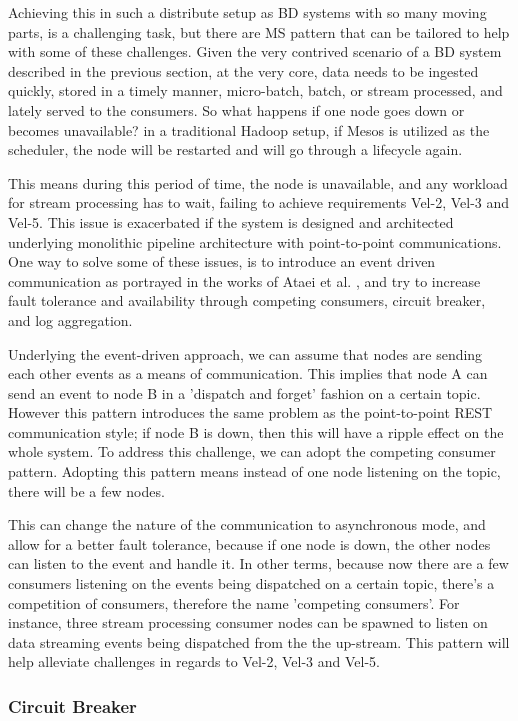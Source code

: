 \documentclass[a4paper,11pt,article,oneside]{memoir}
\begin{document}
Achieving this in such a distribute setup as BD systems with so many moving parts, is a challenging task, but there are MS pattern that can be tailored to help with some of these challenges. Given the very contrived scenario of a BD system described in the previous section, at the very core, data needs to be ingested quickly, stored in a timely manner, micro-batch, batch, or stream processed, and lately served to the consumers. So what happens if one node goes down or becomes unavailable? in a traditional Hadoop setup, if Mesos is utilized as the scheduler, the node will be restarted and will go through a lifecycle again. 

This means during this period of time, the node is unavailable, and any workload for stream processing has to wait, failing to achieve requirements Vel-2, Vel-3 and Vel-5. This issue is exacerbated if the system is designed and architected underlying monolithic pipeline architecture with point-to-point communications. One way to solve some of these issues, is to introduce an event driven communication as portrayed in the works of Ataei et al. \cite{ataei2021neomycelia}, and try to increase fault tolerance and availability through competing consumers, circuit breaker, and log aggregation. 

Underlying the event-driven approach, we can assume that nodes are sending each other events as a means of communication. This implies that node A can send an event to node B in a 'dispatch and forget' fashion on a certain topic. However this pattern introduces the same problem as the point-to-point REST communication style; if node B is down, then this will have a ripple effect on the whole system. To address this challenge, we can adopt the competing consumer pattern. Adopting this pattern means instead of one node listening on the topic, there will be a few nodes. 

This can change the nature of the communication to asynchronous mode, and allow for a better fault tolerance, because if one node is down, the other nodes can listen to the event and handle it. In other terms, because now there are a few consumers listening on the events being dispatched on a certain topic, there's a competition of consumers, therefore the name 'competing consumers'. For instance, three stream processing consumer nodes can be spawned to listen on data streaming events being dispatched from the the up-stream. This pattern will help alleviate challenges in regards to Vel-2, Vel-3 and Vel-5.

\subsubsection{Circuit Breaker}
\end{document}
